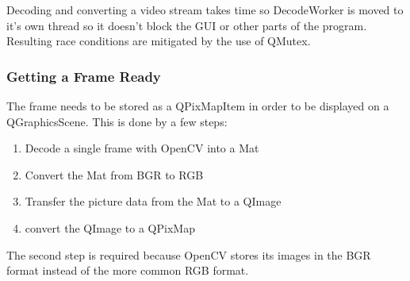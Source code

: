Decoding and converting a video stream takes time so DecodeWorker is moved to it's own thread so it doesn't block the GUI or other parts of the program. Resulting race conditions are mitigated by the use of QMutex.

\subsubsection{Getting a Frame Ready}
\label{sec:gettingAFrameReady}
The frame needs to be stored as a QPixMapItem in order to be displayed on a QGraphicsScene. This is done by a few steps:
\begin{enumerate}
	\item Decode a single frame with OpenCV into a Mat
	\item Convert the Mat from BGR to RGB
	\item Transfer the picture data from the Mat to a QImage
	\item convert the QImage to a QPixMap
\end{enumerate}

The second step is required because OpenCV stores its images in the BGR format instead of the more common RGB format.



